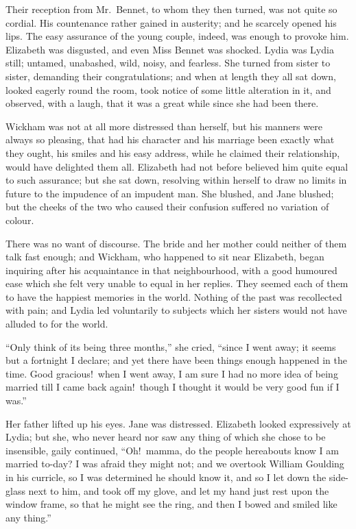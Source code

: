 \documentclass[12pt,english]{book}
\begin{document}
Their reception from Mr.\ Bennet, to whom they then turned, was not
quite so cordial. His countenance rather gained in austerity; and
he scarcely opened his lips. The easy assurance of the young couple,
indeed, was enough to provoke him. Elizabeth was disgusted, and even
Miss Bennet was shocked. Lydia was Lydia still; untamed, unabashed,
wild, noisy, and fearless. She turned from sister to sister, demanding
their congratulations; and when at length they all sat down, looked
eagerly round the room, took notice of some little alteration in it,
and observed, with a laugh, that it was a great while since she had
been there.

Wickham was not at all more distressed than herself, but his manners
were always so pleasing, that had his character and his marriage been
exactly what they ought, his smiles and his easy address, while he
claimed their relationship, would have delighted them all. Elizabeth
had not before believed him quite equal to such assurance; but she
sat down, resolving within herself to draw no limits in future to
the impudence of an impudent man. She blushed, and Jane blushed; but
the cheeks of the two who caused their confusion suffered no variation
of colour.

There was no want of discourse. The bride and her mother could neither
of them talk fast enough; and Wickham, who happened to sit near Elizabeth,
began inquiring after his acquaintance in that neighbourhood, with
a good humoured ease which she felt very unable to equal in her replies.
They seemed each of them to have the happiest memories in the world.
Nothing of the past was recollected with pain; and Lydia led voluntarily
to subjects which her sisters would not have alluded to for the world.

{}``Only think of its being three months,'' she cried, {}``since
I went away; it seems but a fortnight I declare; and yet there have
been things enough happened in the time. Good gracious!\ when I went
away, I am sure I had no more idea of being married till I came back
again!\ though I thought it would be very good fun if I was.''

Her father lifted up his eyes. Jane was distressed. Elizabeth looked
expressively at Lydia; but she, who never heard nor saw any thing
of which she chose to be insensible, gaily continued, {}``Oh!\ mamma,
do the people hereabouts know I am married to-day? I was afraid they
might not; and we overtook William Goulding in his curricle, so I
was determined he should know it, and so I let down the side-glass
next to him, and took off my glove, and let my hand just rest upon
the window frame, so that he might see the ring, and then I bowed
and smiled like any thing.''
\end{document}
